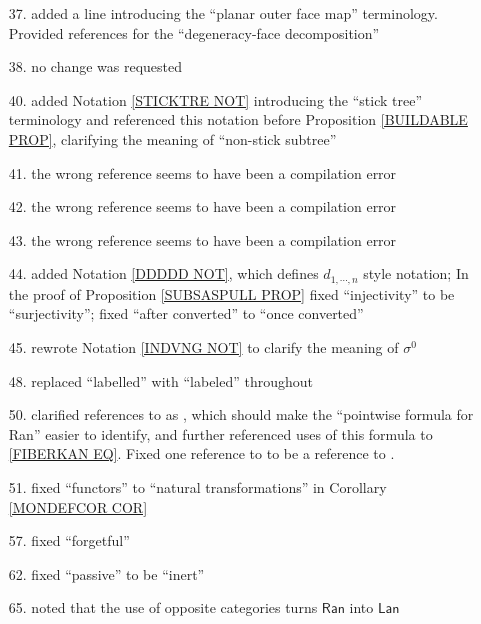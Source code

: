 \documentclass{article}
\begin{document}
\begin{itemize}
\item[37.] added a line introducing the ``planar outer face map'' terminology. Provided references for the ``degeneracy-face decomposition'' 

\item[38.] no change was requested

\item[40.] added Notation \ref{STICKTRE NOT} introducing the ``stick tree'' terminology and referenced this notation before
Proposition \ref{BUILDABLE PROP},
clarifying the meaning of ``non-stick subtree''

\item[41.] the wrong reference seems to have been a compilation error

\item[42.] the wrong reference seems to have been a compilation error

\item[43.] the wrong reference seems to have been a compilation error

\item[44.] added Notation \ref{DDDDD NOT}, 
which defines $d_{1,\cdots,n}$ style notation; 
In the proof of Proposition \ref{SUBSASPULL PROP}
fixed ``injectivity'' to be ``surjectivity''; fixed ``after converted'' to ``once converted''

\item[45.] rewrote Notation \ref{INDVNG NOT}
to clarify the meaning of $\sigma^0$ 

\item[48.] replaced ``labelled'' with ``labeled'' throughout

\item[50.] clarified references to \cite[X.3.1]{McL} as \cite[X.3 Thm. 1]{McL}, which should make the ``pointwise formula for Ran'' easier to identify, and further referenced uses of this formula to \eqref{FIBERKAN EQ}.
Fixed one reference to \cite[X.3.1]{McL}
to be a reference to \cite[IX.3]{McL}.

\item[51.] fixed ``functors'' to ``natural transformations'' in Corollary \ref{MONDEFCOR COR}

\item[57.] fixed ``forgetful''

\item[62.] fixed ``passive'' to be ``inert''

\item[65.] noted that the use of opposite categories turns $\mathsf{Ran}$ into $\mathsf{Lan}$


\end{itemize}
\end{document}
